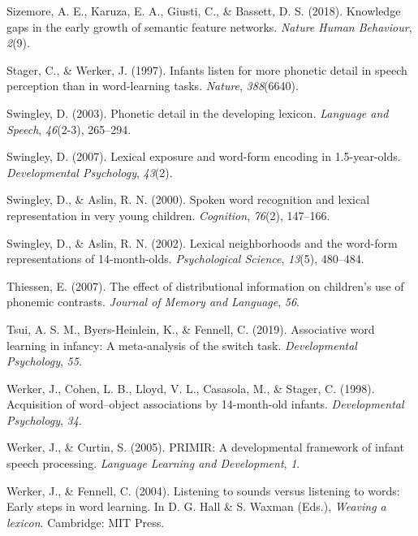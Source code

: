 \documentclass[english,,man]{apa6}
\begin{document}
\leavevmode\hypertarget{ref-sizemore2018}{}%
Sizemore, A. E., Karuza, E. A., Giusti, C., \& Bassett, D. S. (2018). Knowledge gaps in the early growth of semantic feature networks. \emph{Nature Human Behaviour}, \emph{2}(9).

\leavevmode\hypertarget{ref-stager1997}{}%
Stager, C., \& Werker, J. (1997). Infants listen for more phonetic detail in speech perception than in word-learning tasks. \emph{Nature}, \emph{388}(6640).

\leavevmode\hypertarget{ref-swingley2003}{}%
Swingley, D. (2003). Phonetic detail in the developing lexicon. \emph{Language and Speech}, \emph{46}(2-3), 265--294.

\leavevmode\hypertarget{ref-swingley2007}{}%
Swingley, D. (2007). Lexical exposure and word-form encoding in 1.5-year-olds. \emph{Developmental Psychology}, \emph{43}(2).

\leavevmode\hypertarget{ref-swingley2000}{}%
Swingley, D., \& Aslin, R. N. (2000). Spoken word recognition and lexical representation in very young children. \emph{Cognition}, \emph{76}(2), 147--166.

\leavevmode\hypertarget{ref-swingley2002}{}%
Swingley, D., \& Aslin, R. N. (2002). Lexical neighborhoods and the word-form representations of 14-month-olds. \emph{Psychological Science}, \emph{13}(5), 480--484.

\leavevmode\hypertarget{ref-thiessen2007}{}%
Thiessen, E. (2007). The effect of distributional information on children's use of phonemic contrasts. \emph{Journal of Memory and Language}, \emph{56}.

\leavevmode\hypertarget{ref-tsui2019}{}%
Tsui, A. S. M., Byers-Heinlein, K., \& Fennell, C. (2019). Associative word learning in infancy: A meta-analysis of the switch task. \emph{Developmental Psychology}, \emph{55}.

\leavevmode\hypertarget{ref-werker1998}{}%
Werker, J., Cohen, L. B., Lloyd, V. L., Casasola, M., \& Stager, C. (1998). Acquisition of word--object associations by 14-month-old infants. \emph{Developmental Psychology}, \emph{34}.

\leavevmode\hypertarget{ref-werker2005}{}%
Werker, J., \& Curtin, S. (2005). PRIMIR: A developmental framework of infant speech processing. \emph{Language Learning and Development}, \emph{1}.

\leavevmode\hypertarget{ref-werker2004}{}%
Werker, J., \& Fennell, C. (2004). Listening to sounds versus listening to words: Early steps in word learning. In D. G. Hall \& S. Waxman (Eds.), \emph{Weaving a lexicon}. Cambridge: MIT Press.
\end{document}
